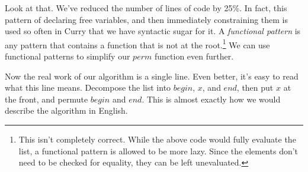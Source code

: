 \documentclass{book}
\theoremstyle{definition}
\newcommand{\Varid}[1]{\mathit{#1}}
\newcommand{\plus}{\mathbin{+\!\!\!+}}
\def\resethooks{%
  \global\let\SaveRestoreHook\empty
  \global\let\ColumnHook\empty}
\let\hspre\empty
\let\hspost\empty
\begin{document}
Look at that.
We've reduced the number of lines of code by 25\%.
In fact, this pattern of declaring free variables, and then immediately constraining them
is used so often in Curry that we have syntactic sugar for it.
A \textit{functional pattern} is any pattern that contains a function that is not at the
root.\footnote{
    This isn't completely correct.  While the above code would fully evaluate the list,
    a functional pattern is allowed to be more lazy.
    Since the elements don't need to be checked for equality, they can be left unevaluated.
}
We can use functional patterns to simplify our \ensuremath{\Varid{perm}} function even further.

\resethooks
Now the real work of our algorithm is a single line.
Even better, it's easy to read what this line means.
Decompose the list into \ensuremath{\Varid{begin}}, \ensuremath{\Varid{x}}, and \ensuremath{\Varid{end}}, then put \ensuremath{\Varid{x}} at the front, and permute \ensuremath{\Varid{begin}} and \ensuremath{\Varid{end}}.
This is almost exactly how we would describe the algorithm in English.
\end{document}
